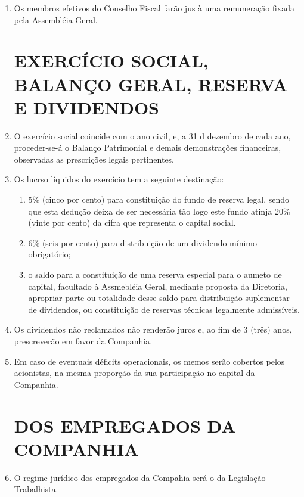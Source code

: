 \documentclass[a4paper,11pt]{report}
\begin{document}
\begin{enumerate}[resume, label=Art. \arabic*]
\item Os membros efetivos do Conselho Fiscal farão jus à uma remuneração fixada pela Assembléia Geral.

\chapter{EXERCÍCIO SOCIAL, BALANÇO GERAL, RESERVA E DIVIDENDOS}

\item O exercício social coincide com o ano civil, e, a 31 d dezembro de cada ano, proceder-se-á o Balanço Patrimonial e demais demonstrações financeiras, observadas as prescrições legais pertinentes.

\item Os lucrso líquidos do exercício tem a seguinte destinação:

        \begin{enumerate}[label=\roman*.]
        \item 5\% (cinco por cento) para constituição do fundo de reserva legal, sendo que esta dedução deixa de ser necessária tão logo este fundo atinja 20\% (vinte por cento) da cifra que representa o capital social.
        \item 6\% (seis por cento) para distribuição de um dividendo mínimo obrigatório;
        \item o saldo para a constituição de uma reserva especial para o aumeto de capital, facultado à Assmebléia Geral, mediante proposta da Diretoria, apropriar parte ou totalidade desse saldo para distribuição suplementar de dividendos, ou constituição de reservas técnicas legalmente admissíveis.
        \end{enumerate}

\item Os dividendos não reclamados não renderão juros e, ao fim de 3 (três) anos, prescreverão em favor da Companhia.

\item Em caso de eventuais déficits operacionais, os memos serão cobertos pelos acionistas, na mesma proporção da sua participação no capital da Companhia.

\chapter{DOS EMPREGADOS DA COMPANHIA}

\item O regime jurídico dos empregados da Compahia será o da Legislação Trabalhista.


\end{enumerate}
\end{document}

